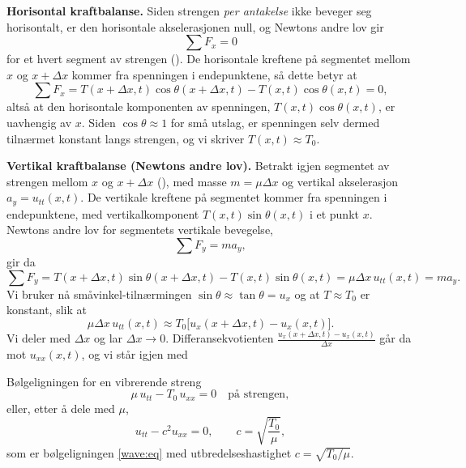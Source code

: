 \textbf{Horisontal kraftbalanse.} Siden strengen \textit{per antakelse} ikke beveger seg horisontalt, er den horisontale akselerasjonen null, og Newtons andre lov gir
\begin{equation}
\sum F_x = 0
\end{equation}
for et hvert segment av strengen (). De horisontale kreftene på segmentet mellom $x$ og $x+\Delta x$ kommer fra spenningen i endepunktene, så dette betyr at
\begin{equation}
\sum F_x = T(x+\Delta x,t)\cos\theta(x+\Delta x,t) - T(x,t)\cos\theta(x,t) = 0,
\end{equation}
altså at den horisontale komponenten av spenningen, $T(x,t)\cos\theta(x,t)$, er uavhengig av $x$. Siden $\cos\theta \approx 1$ for små utslag, er spenningen selv dermed tilnærmet konstant langs strengen, og vi skriver $T(x,t) \approx T_0$.

\textbf{Vertikal kraftbalanse (Newtons andre lov).} Betrakt igjen segmentet av strengen mellom $x$ og $x+\Delta x$ (), med masse $m=\mu \Delta x$ og vertikal akselerasjon $a_y=u_{tt}(x,t)$. De vertikale kreftene på segmentet kommer fra spenningen i endepunktene, med vertikalkomponent $T(x,t)\sin\theta(x,t)$ i et punkt $x$. Newtons andre lov for segmentets vertikale bevegelse,
\begin{equation}
\sum F_y = m a_y,
\end{equation}
gir da
\begin{equation}
\sum F_y = T(x+\Delta x,t)\sin\theta(x+\Delta x,t) - T(x,t)\sin\theta(x,t) = \mu \Delta x \, u_{tt}(x,t) = m a_y.
\end{equation}
Vi bruker nå småvinkel-tilnærmingen $\sin\theta \approx \tan\theta = u_x$ og at $T\approx T_0$ er konstant, slik at
\begin{equation}
\mu \Delta x \, u_{tt}(x,t) \approx T_0\big[u_x(x+\Delta x,t) - u_x(x,t)\big].
\end{equation}
Vi deler med $\Delta x$ og lar $\Delta x \to 0$. Differansekvotienten $\frac{u_x(x+\Delta x,t)-u_x(x,t)}{\Delta x}$ går da mot $u_{xx}(x,t)$, og vi står igjen med

\begin{oppsum}{Bølgeligningen for en vibrerende streng}
\begin{equation}\label{string:waveeq}
\mu \, u_{tt} - T_0 \, u_{xx} = 0 \quad \text{på strengen},
\end{equation}
eller, etter å dele med $\mu$,
\begin{equation}\label{string:waveeq2}
u_{tt} - c^2 u_{xx} = 0, \qquad c = \sqrt{\frac{T_0}{\mu}},
\end{equation}
som er bølgeligningen \eqref{wave:eq} med utbredelseshastighet $c=\sqrt{T_0/\mu}$.
\end{oppsum}

